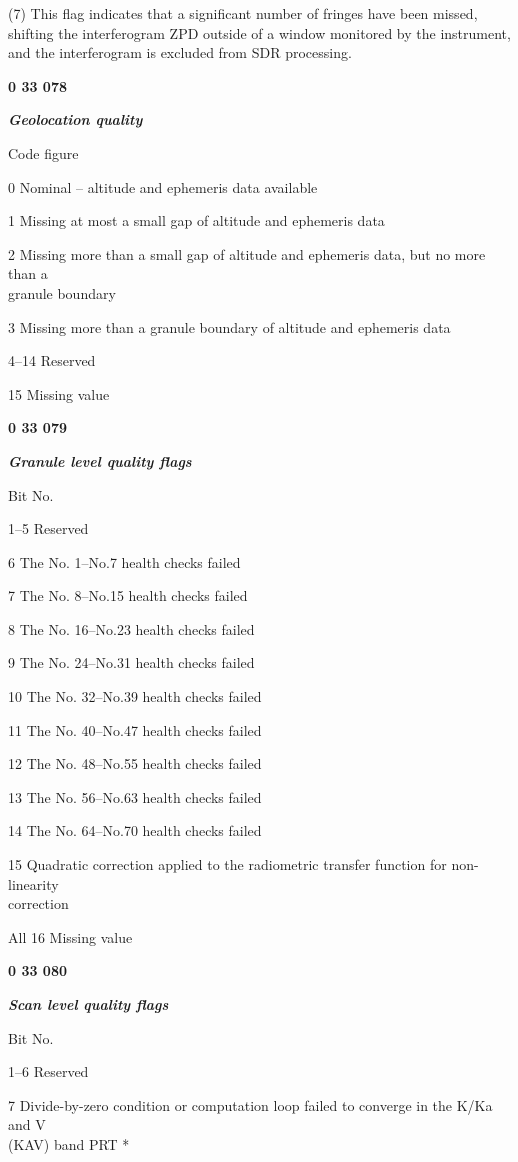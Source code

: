 (7) This flag indicates that a significant number of fringes have been missed, shifting the interferogram ZPD outside of a window monitored by the instrument, and the interferogram is excluded from SDR processing.

\textbf{0 33 078}

\emph{\textbf{Geolocation quality}}

Code figure

0 Nominal -- altitude and ephemeris data available

1 Missing at most a small gap of altitude and ephemeris data

2 Missing more than a small gap of altitude and ephemeris data, but no more than a\\
granule boundary

3 Missing more than a granule boundary of altitude and ephemeris data

4--14 Reserved

15 Missing value

\textbf{0 33 079}

\emph{\textbf{Granule level quality flags}}

Bit No.

1--5 Reserved

6 The No. 1--No.7 health checks failed

7 The No. 8--No.15 health checks failed

8 The No. 16--No.23 health checks failed

9 The No. 24--No.31 health checks failed

10 The No. 32--No.39 health checks failed

11 The No. 40--No.47 health checks failed

12 The No. 48--No.55 health checks failed

13 The No. 56--No.63 health checks failed

14 The No. 64--No.70 health checks failed

15 Quadratic correction applied to the radiometric transfer function for non-linearity\\
correction

All 16 Missing value

\textbf{0 33 080}

\emph{\textbf{Scan level quality flags}}

Bit No.

1--6 Reserved

7 Divide-by-zero condition or computation loop failed to converge in the K/Ka and V\\
(KAV) band PRT *

